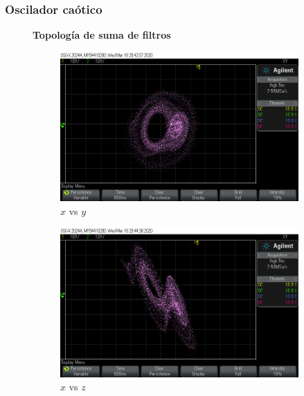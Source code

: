 \documentclass[10pt]{beamer}
\begin{document}
	
	\begin{frame}
		\frametitle{Oscilador caótico}
		\begin{figure}[!ht]
		\textbf{Topología de suma de filtros}
	\caption{Vistas de plano fase del comportamiento del oscilador caótico con $\alpha = 0.8$ y dos enrollamientos.}
	\label{fig:fase_imp_osc}
	  \begin{subfigure}[b]{0.3\textwidth}
	    \includegraphics[trim={6cm 2cm 9cm 2cm},clip,width=\textwidth]{../imagenes/Y2p_X_vs_Y.png}
	    \caption{$x$ vs $y$}
	    \label{Y2p_X_vs_Y}
	  \end{subfigure}
	  \hfill
	  \begin{subfigure}[b]{0.3\textwidth}
	    \includegraphics[trim={6cm 2cm 9cm 2cm},clip,width=\textwidth]{../imagenes/Y4p_X_vs_Z.png}
	    \caption{$x$ vs $z$}
	    \label{fig:Y4p_X_vs_Z}
	  \end{subfigure}
	  \hfill
	  \begin{subfigure}[b]{0.3\textwidth}

\end{subfigure}
\end{figure}
\end{frame}
\end{document}
